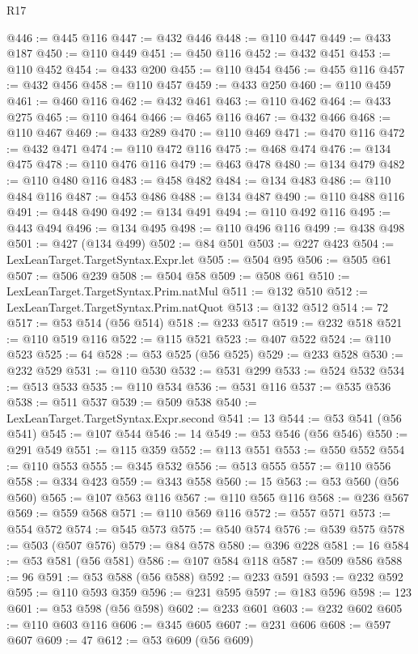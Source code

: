 \begin{lexlean}{R17}
\begin{coremodule}
{{{{{{{{{{{{{{{{{{{{{{{{{{{{{{{{{{{{{{{{{{{{{{{{{{{{{{{{{{{{{{{{{{{{{{{{{{{{{{{{{{{{{@446 := @445 @116
@447 := @432 @446
@448 := @110 @447
@449 := @433 @187
@450 := @110 @449
@451 := @450 @116
@452 := @432 @451
@453 := @110 @452
@454 := @433 @200
@455 := @110 @454
@456 := @455 @116
@457 := @432 @456
@458 := @110 @457
@459 := @433 @250
@460 := @110 @459
@461 := @460 @116
@462 := @432 @461
@463 := @110 @462
@464 := @433 @275
@465 := @110 @464
@466 := @465 @116
@467 := @432 @466
@468 := @110 @467
@469 := @433 @289
@470 := @110 @469
@471 := @470 @116
@472 := @432 @471
@474 := @110 @472 @116
@475 := @468 @474
@476 := @134 @475
@478 := @110 @476 @116
@479 := @463 @478
@480 := @134 @479
@482 := @110 @480 @116
@483 := @458 @482
@484 := @134 @483
@486 := @110 @484 @116
@487 := @453 @486
@488 := @134 @487
@490 := @110 @488 @116
@491 := @448 @490
@492 := @134 @491
@494 := @110 @492 @116
@495 := @443 @494
@496 := @134 @495
@498 := @110 @496 @116
@499 := @438 @498
@501 := @427 (@134 @499)
@502 := @84 @501
@503 := @227 @423
@504 := LexLeanTarget.TargetSyntax.Expr.let
@505 := @504 @95
@506 := @505 @61
@507 := @506 @239
@508 := @504 @58
@509 := @508 @61
@510 := LexLeanTarget.TargetSyntax.Prim.natMul
@511 := @132 @510
@512 := LexLeanTarget.TargetSyntax.Prim.natQuot
@513 := @132 @512
@514 := 72
@517 := @53 @514 (@56 @514)
@518 := @233 @517
@519 := @232 @518
@521 := @110 @519 @116
@522 := @115 @521
@523 := @407 @522
@524 := @110 @523
@525 := 64
@528 := @53 @525 (@56 @525)
@529 := @233 @528
@530 := @232 @529
@531 := @110 @530
@532 := @531 @299
@533 := @524 @532
@534 := @513 @533
@535 := @110 @534
@536 := @531 @116
@537 := @535 @536
@538 := @511 @537
@539 := @509 @538
@540 := LexLeanTarget.TargetSyntax.Expr.second
@541 := 13
@544 := @53 @541 (@56 @541)
@545 := @107 @544
@546 := 14
@549 := @53 @546 (@56 @546)
@550 := @291 @549
@551 := @115 @359
@552 := @113 @551
@553 := @550 @552
@554 := @110 @553
@555 := @345 @532
@556 := @513 @555
@557 := @110 @556
@558 := @334 @423
@559 := @343 @558
@560 := 15
@563 := @53 @560 (@56 @560)
@565 := @107 @563 @116
@567 := @110 @565 @116
@568 := @236 @567
@569 := @559 @568
@571 := @110 @569 @116
@572 := @557 @571
@573 := @554 @572
@574 := @545 @573
@575 := @540 @574
@576 := @539 @575
@578 := @503 (@507 @576)
@579 := @84 @578
@580 := @396 @228
@581 := 16
@584 := @53 @581 (@56 @581)
@586 := @107 @584 @118
@587 := @509 @586
@588 := 96
@591 := @53 @588 (@56 @588)
@592 := @233 @591
@593 := @232 @592
@595 := @110 @593 @359
@596 := @231 @595
@597 := @183 @596
@598 := 123
@601 := @53 @598 (@56 @598)
@602 := @233 @601
@603 := @232 @602
@605 := @110 @603 @116
@606 := @345 @605
@607 := @231 @606
@608 := @597 @607
@609 := 47
@612 := @53 @609 (@56 @609)
}}}}}}}}}}}}}}}}}}}}}}}}}}}}}}}}}}}}}}}}}}}}}}}}}}}}}}}}}}}}}}}}}}}}}}}}}}}}}}}}}}}}}
\end{coremodule}
\end{lexlean}
